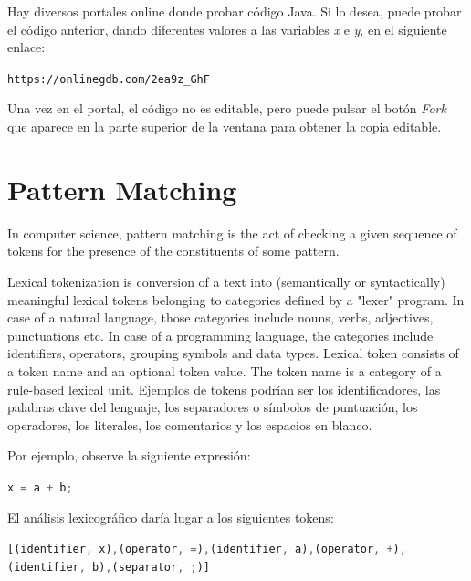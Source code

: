 \begin{Nota}
   \small
   Hay diversos portales online donde probar código Java. Si lo desea, puede probar el código anterior, dando diferentes valores a las variables \textit{x} e \textit{y}, en el siguiente enlace:
   
   {\centering \texttt{https://onlinegdb.com/2ea9z\_GhF} \par}
   
   \vspace{1em}
   
   Una vez en el portal, el código no es editable, pero puede pulsar el botón \textit{Fork} que aparece en la parte superior de la ventana para obtener la copia editable. 
\end{Nota}






\section{Pattern Matching}
In computer science, pattern matching is the act of checking a given sequence of tokens for the presence of the constituents of some pattern. 

Lexical tokenization is conversion of a text into (semantically or syntactically) meaningful lexical tokens belonging to categories defined by a "lexer" program. In case of a natural language, those categories include nouns, verbs, adjectives, punctuations etc. In case of a programming language, the categories include identifiers, operators, grouping symbols and data types. Lexical token consists of a token name and an optional token value. The token name is a category of a rule-based lexical unit. Ejemplos de tokens podrían ser los identificadores, las palabras clave del lenguaje, los separadores o símbolos de puntuación, los operadores, los literales, los comentarios y los espacios en blanco.

Por ejemplo, observe la siguiente expresión:

{\lstinline[language=Rust]!x = a + b;!}

El análisis lexicográfico daría lugar a los siguientes tokens:

{\lstinline[language=Rust]![(identifier, x),(operator, =),(identifier, a),(operator, +),(identifier, b),(separator, ;)]!}

